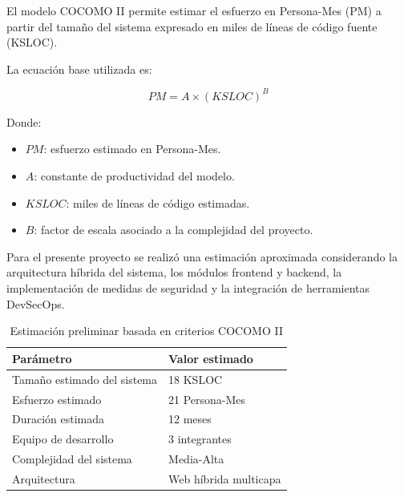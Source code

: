 \documentclass[12pt,oneside,letterpaper]{book}
\begin{document}
El modelo COCOMO II permite estimar el esfuerzo en Persona-Mes (PM) a partir del tamaño del sistema expresado en miles de líneas de código fuente (KSLOC).

La ecuación base utilizada es:

\[
PM = A \times (KSLOC)^B
\]

Donde:

\begin{itemize}
    \item \(PM\): esfuerzo estimado en Persona-Mes.
    \item \(A\): constante de productividad del modelo.
    \item \(KSLOC\): miles de líneas de código estimadas.
    \item \(B\): factor de escala asociado a la complejidad del proyecto.
\end{itemize}

Para el presente proyecto se realizó una estimación aproximada considerando la arquitectura híbrida del sistema, los módulos frontend y backend, la implementación de medidas de seguridad y la integración de herramientas DevSecOps.

\vspace{0.3cm}

\begin{table}[H]
\centering
\caption{Estimación preliminar basada en criterios COCOMO II}

\begin{tabular}{p{5cm} p{5cm}}
\toprule
\rowcolor{headerblue}
\textbf{Parámetro} & \textbf{Valor estimado} \\
\midrule

Tamaño estimado del sistema & 18 KSLOC \\

Esfuerzo estimado & 21 Persona-Mes \\

Duración estimada & 12 meses \\

Equipo de desarrollo & 3 integrantes \\

Complejidad del sistema & Media-Alta \\

Arquitectura & Web híbrida multicapa \\

\bottomrule
\end{tabular}
\end{table}
\end{document}
